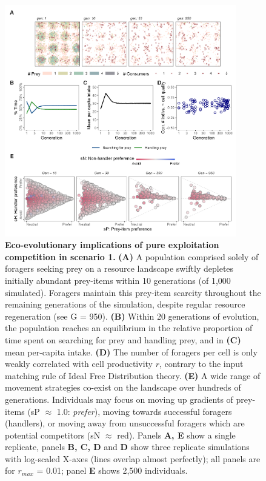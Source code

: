 \begin{figure}[t!]
    \centering
    \includegraphics[width=0.9\textwidth]{figures/kleptomove/fig_01.png}
    \caption{
        \textbf{Eco-evolutionary implications of pure exploitation competition in scenario 1.}
        \textbf{(A)} A population comprised solely of foragers seeking prey on a resource landscape swiftly depletes initially abundant prey-items within 10 generations (of 1,000 simulated).
        Foragers maintain this prey-item scarcity throughout the remaining generations of the simulation, despite regular resource regeneration (see G = 950).
        \textbf{(B)} Within 20 generations of evolution, the population reaches an equilibrium in the relative proportion of time spent on searching for prey and handling prey, and in \textbf{(C)} mean per-capita intake.
        \textbf{(D)} The number of foragers per cell is only weakly correlated with cell productivity $r$, contrary to the input matching rule of Ideal Free Distribution theory.
        \textbf{(E)} A wide range of movement strategies co-exist on the landscape over hundreds of generations.
        Individuals may focus on moving up gradients of prey-items (sP $\approx$ 1.0: \textit{prefer}), moving towards successful foragers (handlers), or moving away from unsuccessful foragers which are potential competitors (sN $\approx$ red).
        Panels \textbf{A, E} show a single replicate, panels \textbf{B, C, D} and \textbf{D} show three replicate simulations with log-scaled X-axes (lines overlap almost perfectly); all panels are for $r_{max}$ = 0.01; panel \textbf{E} shows 2,500 individuals.
    }
    \label{klepto_fig_01}
\end{figure}


